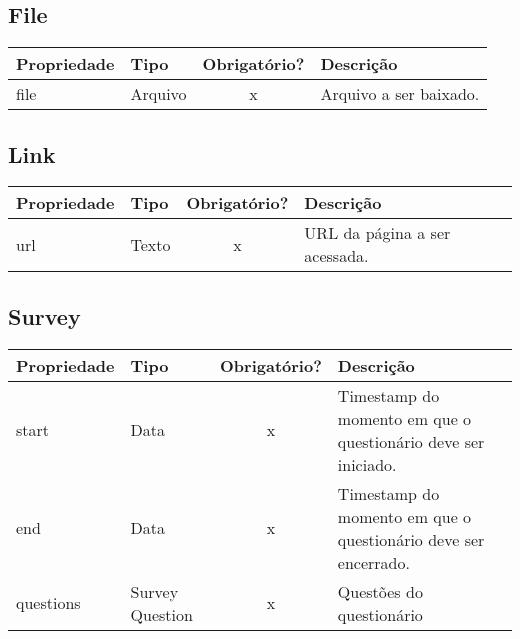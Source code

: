 \subsection{File} \label{File}
\begin{table}[H]
	\footnotesize
	\begin{tabularx}{\textwidth}{|X|X|c|p{7.8cm}|}   \hline \rowcolor[rgb]{0.8,0.8,0.8}
		
		\textbf{Propriedade} & \textbf{Tipo} & \textbf{Obrigatório?} & \centerline{\textbf{Descrição}} \\\hline  	
		
		file & Arquivo & x & Arquivo a ser baixado. \\\hline			
		
	\end{tabularx}	
\end{table}



\subsection{Link} \label{Link}
\begin{table}[H]
	\footnotesize
	\begin{tabularx}{\textwidth}{|X|X|c|p{7.8cm}|}   \hline \rowcolor[rgb]{0.8,0.8,0.8}
		
		\textbf{Propriedade} & \textbf{Tipo} & \textbf{Obrigatório?} & \centerline{\textbf{Descrição}} \\\hline  	
		
		url & Texto & x & URL da página a ser acessada. \\\hline			
		
	\end{tabularx}	
\end{table}



\subsection{Survey} \label{Survey}
\begin{table}[H]
	\footnotesize
	\begin{tabularx}{\textwidth}{|X|X|c|p{7.8cm}|}   \hline \rowcolor[rgb]{0.8,0.8,0.8}
		
		\textbf{Propriedade} & \textbf{Tipo} & \textbf{Obrigatório?} & \centerline{\textbf{Descrição}} \\\hline  	
		
		start & Data & x & Timestamp do momento em que o questionário deve ser iniciado. \\\hline		
		end & Data & x & Timestamp do momento em que o questionário deve ser encerrado. \\\hline
		questions & Survey Question & x & Questões do questionário \\\hline			
		
	\end{tabularx}	
\end{table}


